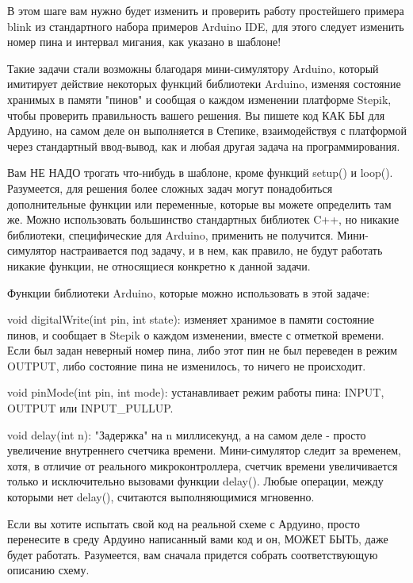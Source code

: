 
В этом шаге вам нужно будет изменить и проверить работу простейшего примера blink из 
стандартного набора примеров Arduino IDE, для этого следует изменить номер пина и интервал мигания, 
как указано в шаблоне!

Такие задачи стали возможны благодаря мини-симулятору Arduino, который имитирует действие 
некоторых функций библиотеки Arduino, изменяя состояние хранимых в памяти "пинов" и сообщая о 
каждом изменении платформе Stepik, чтобы проверить правильность вашего решения.  Вы пишете код 
КАК БЫ для Ардуино, на самом деле он выполняется в Степике, взаимодействуя с платформой через 
стандартный ввод-вывод, как и любая другая задача на программирования.

Вам НЕ НАДО трогать что-нибудь в шаблоне, кроме функций  setup() и loop().  
Разумеется, для решения более сложных задач могут понадобиться дополнительные 
функции или переменные, которые вы можете определить там же.  Можно использовать большинство 
стандартных библиотек C++, но никакие библиотеки, специфические для Arduino, применить не получится.  
Мини-симулятор настраивается под задачу, и в нем, как правило, не будут работать никакие функции, не 
относящиеся конкретно к данной задачи.

Функции библиотеки Arduino, которые можно использовать в этой задаче:

void digitalWrite(int pin, int  state): изменяет хранимое в памяти состояние пинов, и сообщает 
в Stepik о каждом изменении, вместе с отметкой времени.  Если был задан неверный номер пина, либо 
этот пин не был переведен в режим OUTPUT, либо состояние пина не изменилось, то ничего не происходит. 

void pinMode(int pin, int mode):  устанавливает режим работы пина:  INPUT, \linebreak OUTPUT или INPUT\_PULLUP. 

void delay(int n):  "Задержка" на n миллисекунд, а на самом деле - просто увеличение внутреннего 
счетчика времени. Мини-симулятор следит за временем, хотя, в отличие от реального микроконтроллера, 
счетчик времени увеличивается только и исключительно вызовами функции delay(). Любые операции, между 
которыми нет delay(), считаются выполняющимися мгновенно.  

Если вы хотите испытать свой код на реальной схеме с Ардуино,  просто перенесите в среду 
Ардуино написанный вами код и он, МОЖЕТ БЫТЬ, даже будет работать.  Разумеется, вам сначала 
придется собрать соответствующую описанию схему.

